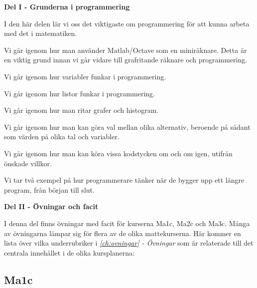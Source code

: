 
\vspace{20pt}
{\large{\textbf{Del I - Grunderna i programmering}}}

I den här delen lär vi oss det viktigaste om programmering för att kunna arbeta med det i matematiken.
\vspace{10pt}
\begin{addmargin}[1.7em]{1.7em}%


Vi går igenom hur man använder Matlab/Octave som en miniräknare. Detta är en viktig grund innan vi går vidare till grafritande räknare och programmering.


Vi går igenom hur variabler funkar i programmering.


Vi går igenom hur listor funkar i programmering.


Vi går igenom hur man ritar grafer och histogram.


Vi går igenom hur man kan göra val mellan olika alternativ, beroende på sådant som värden på olika tal och variabler.


Vi går igenom hur man kan köra vissa kodstycken om och om igen, utifrån önskade villkor.


Vi tar två exempel på hur programmerare tänker när de bygger upp ett längre program, från början till slut.

\end{addmargin}

\newpage
{\large{\textbf{Del II - Övningar och facit}}}

I denna del finns övningar med facit för kurserna Ma1c, Ma2c och Ma3c. Många av övningarna lämpar sig för flera av de olika mattekurserna. Här kommer en lista över vilka underrubriker i \emph{\autoref{ch:ovningar} - Övningar} som är relaterade till det centrala innehållet i de olika kursplanerna:

\subsection*{Ma1c}

